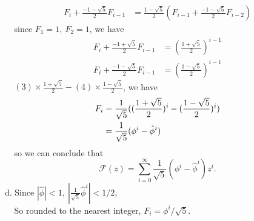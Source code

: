 \documentclass[12pt, a4paper, UTF8]{ctexart}
\begin{document}
\begin{solution}
\begin{align}
      F_{i} + \frac{-1 - \sqrt{5}}{2}F_{i - 1} & = \frac{1 - \sqrt{5}}{2}(F_{i - 1} + \frac{-1 - \sqrt{5}}{2}F_{i - 2}) 
  \end{align}
  $~~~~~$since $F_{1} = 1,~F_{2} = 1$, we have
  \begin{align}
    F_{i} + \frac{-1 + \sqrt{5}}{2}F_{i - 1} & = (\frac{1 + \sqrt{5}}{2})^{i - 1} \\
    F_{i} + \frac{-1 - \sqrt{5}}{2}F_{i - 1} & = (\frac{1 - \sqrt{5}}{2})^{i - 1}    
  \end{align}
  $~~~~~(3) \times \frac{1 + \sqrt{5}}{2} - (4) \times \frac{1 - \sqrt{5}}{2}$, we have
  \begin{align}
      F_{i} & = \frac{1}{\sqrt{5}}((\frac{1 + \sqrt{5}}{2})^{i} - (\frac{1 - \sqrt{5}}{2})^{i}) \notag \\
            & = \frac{1}{\sqrt{5}}(\phi^{i} - \hat{\phi}^{i})
  \end{align}
  $~~~~~$so we can conclude that
  \[ \mathcal{F}(z) = \sum_{i = 0}^{\infty} \frac{1}{\sqrt{5}}(\phi^{i} - \hat{\phi}^{i})z^{i}. \]
  d. Since $|\hat{\phi}| < 1,~|\frac{1}{\sqrt{5}}\hat{\phi}^{i}| < 1/2$,\\
  $~~~~~$So rounded to the nearest integer, $F_{i} = \phi^{i} / \sqrt{5}.$
\end{solution}

\end{document}
